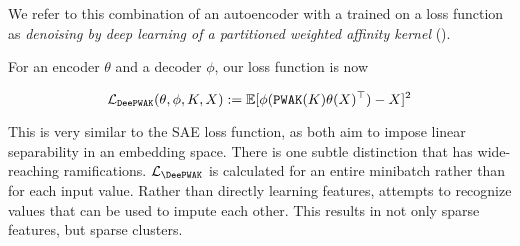 We refer to this combination of an autoencoder with a \Partitioner trained on a \PWAK loss function as \textit{denoising by deep learning of a partitioned weighted affinity kernel} (\DeePWAK).

For an encoder $\theta$ and a decoder $\phi$, our loss function is now

\begin{equation}
  \mathcal{L}_{\mathop{\mathtt{DeePWAK}}\limits}(\theta,\phi,K,X) := \mathbb{E}[\phi(\mathop{\mathtt{PWAK}}\limits(K)\theta(X)^\top) - X]^2
\end{equation}

This is very similar to the SAE loss function, as both aim to impose linear separability in an embedding space.
There is one subtle distinction that has wide-reaching ramifications.
$\mathcal{L}_{\DeePWAK}$ is calculated for an entire minibatch rather than for each input value.
Rather than directly learning features, \DeePWAK attempts to recognize values that can be used to impute each other.
This results in not only sparse features, but sparse clusters.
